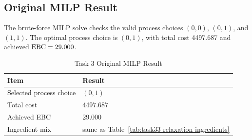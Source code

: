 \subsection{Original MILP Result}
\label{sec:task3-milp}
The brute-force MILP solve checks the valid process choices $(0,0)$, $(0,1)$, and $(1,1)$. The optimal process choice is $(0,1)$, with total cost 4497.687 and achieved $\mathrm{EBC}=29.000$.

\begin{table}[!t]
\renewcommand{\arraystretch}{1.15}
\caption{Task 3 Original MILP Result}
\label{tab:task33-milp}
\centering
\small
\begin{tabular}{@{}ll@{}}
\toprule
Item & Result \\
\midrule
Selected process choice & $(0,1)$ \\
Total cost & 4497.687 \\
Achieved EBC & 29.000 \\
Ingredient mix & same as Table~\ref{tab:task33-relaxation-ingredients} \\
\bottomrule
\end{tabular}
\end{table}

